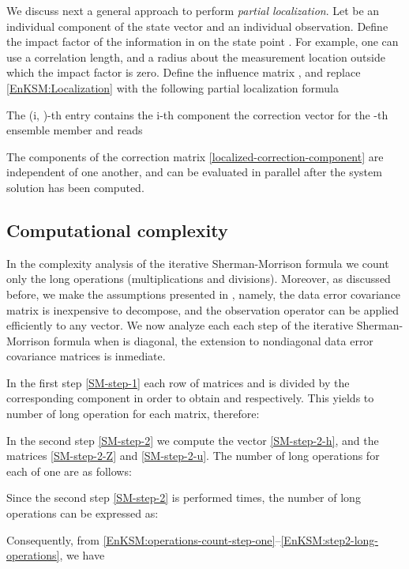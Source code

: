 \documentclass[12pt]{article}
\begin{document}
We discuss next a general approach to perform {\em partial localization}.
Let  be an individual component of the state vector and  an individual observation. Define the impact factor 
of the information in  on the state point . For example, one can use a
correlation length, and a radius about the measurement location outside which  the impact factor is zero.
Define the influence matrix , and
replace \eqref{EnKSM:Localization} with the following partial localization formula

The (i, )-th entry contains the i-th component the correction vector for the -th ensemble member and reads

The components of the correction matrix \eqref{localized-correction-component} are independent of one another, and can be evaluated in parallel
after the system solution  has been computed.



\subsection{Computational complexity}
\label{Sec:computational-complexity}


In the complexity analysis of the iterative Sherman-Morrison formula we count only the long operations (multiplications and divisions). Moreover, as discussed before, we make the assumptions presented in \cite{Tippett2003,Jan06}, namely, the data error covariance matrix  is inexpensive to decompose, and the observation operator  can be applied efficiently to any vector. We now analyze each each step of the iterative Sherman-Morrison formula when  is diagonal, the extension to nondiagonal data error covariance matrices is inmediate.

In the first step \eqref{SM-step-1} each row  of matrices  and  is divided by the corresponding component  in order to obtain  and  respectively. This yields to  number of long operation for each matrix, therefore:


In the second step  \eqref{SM-step-2} we compute the vector  \eqref{SM-step-2-h}, and the matrices  \eqref{SM-step-2-Z} and  \eqref{SM-step-2-u}. The number of long operations for each of one are as follows:

Since the second step \eqref{SM-step-2} is performed  times, the number of long operations can be expressed as:

Consequently, from \eqref{EnKSM:operations-count-step-one}--\eqref{EnKSM:step2-long-operations}, we have
\end{document}

